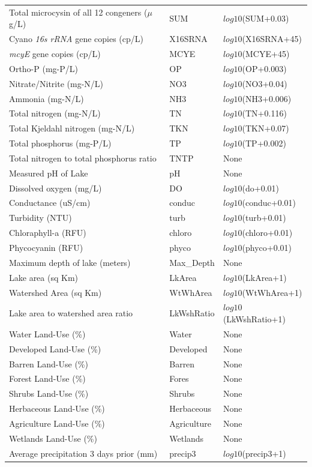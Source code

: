 \begin{center}
\begin{longtable}{p{3.5cm}p{1cm}p{3.3cm}}
Total microcysin of all 12 congeners ($\mu$g/L) & SUM &  $log10$(SUM+0.03) \\
Cyano \emph{16s rRNA} gene copies (cp/L) & X16SRNA &  $log10$(X16SRNA+45) \\
\emph{mcyE} gene copies (cp/L) & MCYE &  $log10$(MCYE+45) \\
Ortho-P (mg-P/L) & OP & $log10$(OP+0.003) \\
Nitrate/Nitrite (mg-N/L) & NO3 &  $log10$(NO3+0.04) \\
Ammonia (mg-N/L) & NH3 & $log10$(NH3+0.006) \\
Total nitrogen (mg-N/L) & TN & $log10$(TN+0.116) \\
Total Kjeldahl nitrogen (mg-N/L) & TKN & $log10$(TKN+0.07) \\
Total phosphorus (mg-P/L) & TP & $log10$(TP+0.002) \\
Total nitrogen to total phosphorus ratio & TNTP &  None \\
Measured pH of Lake & pH & None \\
Dissolved oxygen (mg/L) & DO &  $log10$(do+0.01) \\
Conductance (uS/cm) & conduc &  $log10$(conduc+0.01) \\
Turbidity (NTU) & turb &  $log10$(turb+0.01) \\
Chloraphyll-a (RFU) & chloro & $log10$(chloro+0.01) \\
Phycocyanin (RFU) & phyco &  $log10$(phyco+0.01) \\
Maximum depth of lake (meters) &   Max\_Depth &  None \\
Lake area (sq Km) & LkArea & $log10$(LkArea+1) \\
Watershed Area (sq Km) &  WtWhArea & $log10$(WtWhArea+1) \\
Lake area to watershed area ratio & LkWshRatio &  $log10$(LkWshRatio+1) \\
Water Land-Use (\%) & Water &  None \\
Developed Land-Use  (\%) & Developed & None \\
Barren Land-Use (\%) & Barren & None \\
Forest Land-Use (\%) & Fores & None \\
Shrubs Land-Use (\%) & Shrubs & None \\
Herbaceous Land-Use (\%) & Herbaceous  & None \\
Agriculture Land-Use (\%) & Agriculture & None \\
Wetlands Land-Use (\%) & Wetlands & None \\
Average precipitation 3 days prior (mm) & precip3 &  $log10$(precip3+1) \\

\end{longtable}
\end{center}
